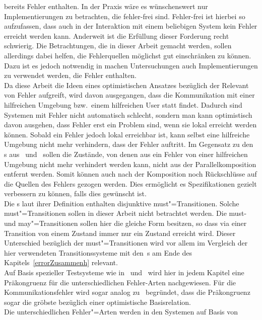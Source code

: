 bereits Fehler enthalten. In der Praxis wäre es wünschenswert nur
Implementierungen zu betrachten, die fehler-frei sind. Fehler-frei ist hierbei
so aufzufassen, dass auch in der Interaktion mit einem beliebigen System kein
Fehler erreicht werden kann. Anderweit ist die Erfüllung dieser Forderung recht
schwierig. Die Betrachtungen, die in dieser Arbeit gemacht werden, sollen
allerdings dabei helfen, die Fehlerquellen möglichst gut einschränken zu
können. Dazu ist es jedoch notwendig in machen Untersuchungen auch
Implementierungen zu verwendet werden, die Fehler enthalten.\\
Da diese Arbeit die Ideen eines optimistischen Ansatzes bezüglich der Relevant
von Fehler aufgreift, wird davon ausgegangen, dass die Kommunikation
mit einer hilfreichen Umgebung bzw.\ einem hilfreichen User statt findet.
Dadurch sind Systemen mit Fehler nicht automatisch schlecht, sondern man kann
optimistisch davon ausgehen, dass Fehler erst ein Problem sind, wenn sie lokal
erreicht werden können. Sobald ein Fehler jedoch lokal erreichbar ist, kann
selbst eine hilfreiche Umgebung nicht mehr verhindern, dass der Fehler
auftritt. Im Gegensatz zu den \MIA{}s aus~\cite{Luttgen2013MIA1}
und~\cite{Vogler2016MIA3} sollen die Zustände, von denen aus ein Fehler von
einer hilfreichen Umgebung nicht mehr verhindert werden kann, nicht aus der
Parallelkomposition entfernt werden. Somit können auch nach der Komposition
noch Rückschlüsse auf die Quellen des Fehlers gezogen werden. Dies ermöglicht
es Spezifikationen gezielt verbessern zu können, falls dies gewünscht ist.\\
Die \MIA{}s laut ihrer Definition enthalten disjunktive must"=Transitionen.
Solche must"=Transitionen sollen in dieser Arbeit nicht betrachtet werden. Die
must- und may"=Transitionen sollen hier die gleiche Form besitzen, so dass via
einer Transition von einem Zustand immer nur ein Zustand erreicht wird. Dieser
Unterschied bezüglich der must"=Transitionen wird vor allem im Vergleich der
hier verwendeten Transitionssysteme mit den~\MIA{}s am Ende des
Kapitels~\ref{errorZusammenh} relevant.\\
Auf Basis spezieller Testsysteme wie in~\cite{Vogler2015FailSem}
und~\cite{Vogler2017dMTS} wird hier in jedem Kapitel eine Präkongruenz für die
unterschiedlichen Fehler-Arten nachgewiesen. Für die Kommunikationsfehler wird
sogar analog zu~\cite{Schinko2016BA} begründet, dass die Präkongruenz sogar die
gröbste bezüglich einer optimistische Basisrelation.\\
Die unterschiedlichen Fehler"=Arten werden in den Systemen auf Basis von
